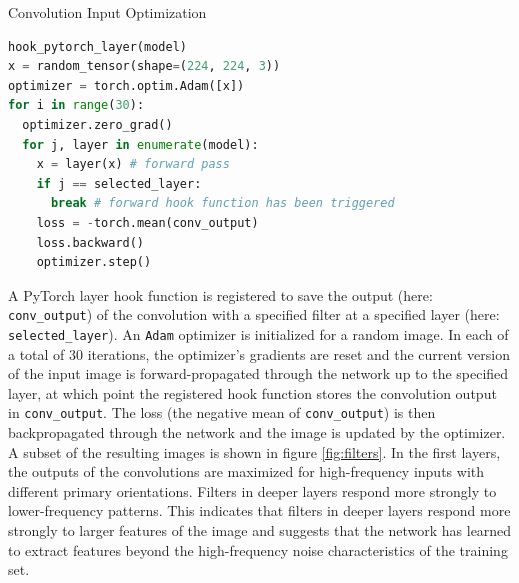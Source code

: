 \documentclass[a4paper]{article}
\begin{document}
\begin{algorithm}
     \caption{Convolution Input Optimization}\label{alg:filter_visualization}
     \begin{lstlisting}[language=Python]
hook_pytorch_layer(model)
x = random_tensor(shape=(224, 224, 3))
optimizer = torch.optim.Adam([x])
for i in range(30):
  optimizer.zero_grad()
  for j, layer in enumerate(model):
    x = layer(x) # forward pass
    if j == selected_layer:
      break # forward hook function has been triggered
    loss = -torch.mean(conv_output)
    loss.backward()
    optimizer.step()
     \end{lstlisting}
\end{algorithm}

A PyTorch layer hook function is registered to save the output (here: \texttt{conv\_output}) of the convolution with a specified filter at a specified layer (here: \texttt{selected\_layer}). An \texttt{Adam} optimizer \cite{Kingma2014} is initialized for a random image. In each of a total of 30 iterations, the optimizer's gradients are reset and the current version of the input image is forward-propagated through the network up to the specified layer, at which point the registered hook function stores the convolution output in \texttt{conv\_output}. The loss (the negative mean of \texttt{conv\_output}) is then backpropagated through the network and the image is updated by the optimizer.\\
A subset of the resulting images is shown in figure \ref{fig:filters}. In the first layers, the outputs of the convolutions are maximized for high-frequency inputs with different primary orientations. Filters in deeper layers respond more strongly to lower-frequency patterns. This indicates that filters in deeper layers respond more strongly to larger features of the image and suggests that the network has learned to extract features beyond the high-frequency noise characteristics of the training set.
\end{document}
